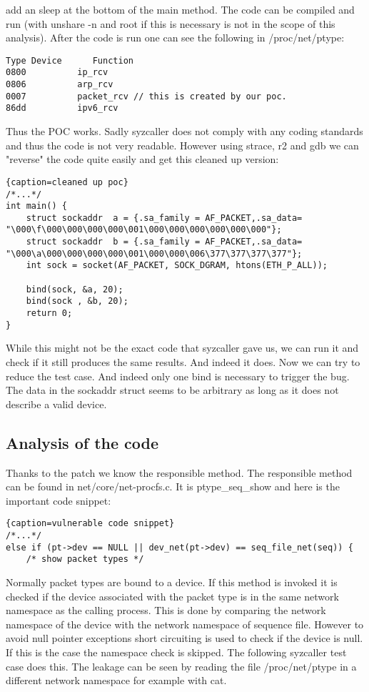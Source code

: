 \documentclass[10pt,twocolumn,a4paper]{article}
\begin{document}
add an sleep at the bottom of the main method. The code can be compiled and run (with unshare -n and root if this
is necessary is not in the scope of this analysis). After the code is run one can see the following
in /proc/net/ptype:
\begin{lstlisting}
Type Device      Function
0800          ip_rcv
0806          arp_rcv
0007          packet_rcv // this is created by our poc.
86dd          ipv6_rcv
\end{lstlisting}
Thus the POC works. Sadly syzcaller does not comply with any coding standards and thus the code is
not very readable. However using strace, r2\cite{29} and gdb\cite{28} we can "reverse" the code quite easily and get this
cleaned up version:
\begin{lstlisting}{caption=cleaned up poc}
/*...*/
int main() {
    struct sockaddr  a = {.sa_family = AF_PACKET,.sa_data= "\000\f\000\000\000\000\001\000\000\000\000\000\000"};
    struct sockaddr  b = {.sa_family = AF_PACKET,.sa_data= "\000\a\000\000\000\000\001\000\000\006\377\377\377\377"};
    int sock = socket(AF_PACKET, SOCK_DGRAM, htons(ETH_P_ALL));

    bind(sock, &a, 20);
    bind(sock , &b, 20);
    return 0;
}
\end{lstlisting}
While this might not be the exact code that syzcaller gave us, we can run it and check if it still
produces the same results. And indeed it does. Now we can try to reduce the test case. And indeed
only one bind is necessary to trigger the bug. The data in the sockaddr struct seems to be arbitrary
as long as it does not describe a valid device. 
\subsection{Analysis of the code}
Thanks to the patch we know the responsible method.
The responsible method can be found in net/core/net-procfs.c. It is ptype\_seq\_show
and here is the important code snippet:
\begin{lstlisting}{caption=vulnerable code snippet}
/*...*/
else if (pt->dev == NULL || dev_net(pt->dev) == seq_file_net(seq)) {
    /* show packet types */
\end{lstlisting}
Normally packet types are bound to a device. If this method is invoked it is checked if the device
associated with the packet type is in the same network namespace as the calling process. This is
done by comparing the network namespace of the device with the network namespace of sequence file.
However to avoid null pointer exceptions short circuiting is used to check if the device is null. If
this is the case the namespace check is skipped. The following syzcaller test case does this.
The leakage can be seen by reading the file /proc/net/ptype in a different network namespace for
example with cat.
\end{document}
